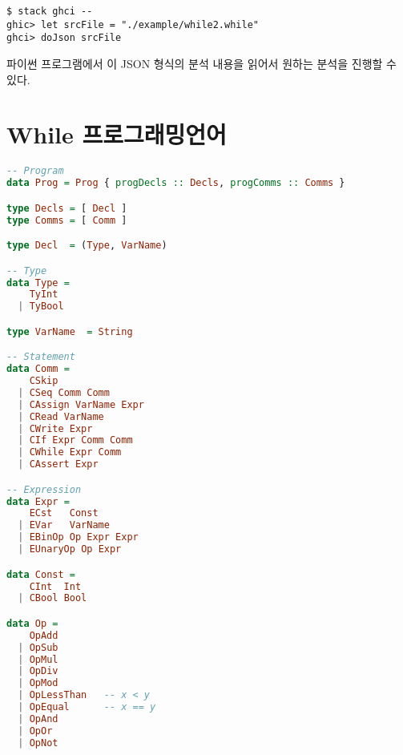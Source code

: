 \documentclass[a4paper]{book}
\begin{document}
\begin{verbatim}
$ stack ghci --
ghic> let srcFile = "./example/while2.while"
ghci> doJson srcFile
\end{verbatim}

파이썬 프로그램에서 이 JSON 형식의 분석 내용을 읽어서 원하는 분석을
진행할 수 있다.

\chapter{While 프로그래밍언어}

\begin{lstlisting}[language=Haskell]
-- Program
data Prog = Prog { progDecls :: Decls, progComms :: Comms }

type Decls = [ Decl ]
type Comms = [ Comm ]

type Decl  = (Type, VarName)

-- Type
data Type =
    TyInt
  | TyBool

type VarName  = String

-- Statement
data Comm =
    CSkip
  | CSeq Comm Comm
  | CAssign VarName Expr
  | CRead VarName
  | CWrite Expr
  | CIf Expr Comm Comm
  | CWhile Expr Comm
  | CAssert Expr

-- Expression
data Expr =
    ECst   Const
  | EVar   VarName
  | EBinOp Op Expr Expr
  | EUnaryOp Op Expr

data Const =
    CInt  Int
  | CBool Bool

data Op =
    OpAdd
  | OpSub
  | OpMul
  | OpDiv
  | OpMod
  | OpLessThan   -- x < y
  | OpEqual      -- x == y
  | OpAnd
  | OpOr
  | OpNot
\end{lstlisting}





\end{document}
